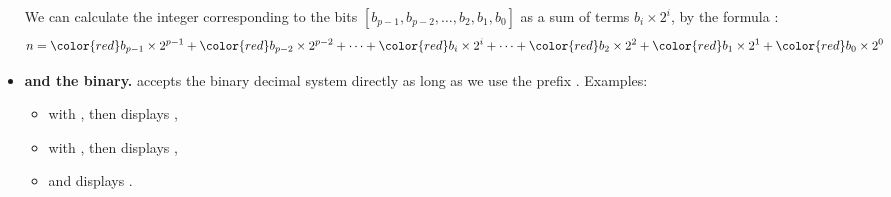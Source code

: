 \documentclass[11pt,class=report,crop=false]{standalone}
\begin{document}
\begin{cours}[Binary]
\begin{itemize}
We can calculate the integer corresponding to the bits $[b_{p-1},b_{p-2}, \ldots,b_2,b_1,b_0]$ as a sum of terms $b_i \times 2^i$, by the formula :
$$n = {\color{red}b_{p-1}} \times 2^{p-1} + {\color{red}b_{p-2}} \times 2^{p-2} + \cdots + {\color{red}b_i} \times 2^i +  \cdots + {\color{red}b_2} \times 2^2 + {\color{red}b_1} \times 2^1 + {\color{red}b_0} \times 2^0$$
  
    \item \textbf{\Python{} and the binary.} \Python{} accepts the binary decimal system directly as long as we use the prefix \og{}\fg{}.
    Examples:
    \begin{itemize}
      \item with , then  displays ,
      \item with , then  displays ,
      \item and  displays .
    \end{itemize} 
 \end{itemize}     

\end{cours}


\end{document}

